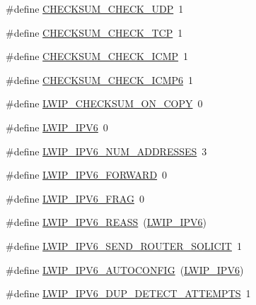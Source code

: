 \begin{DoxyCompactItemize}
\item 
\#define \hyperlink{group__lwip__opts__checksum_ga6747f7b72abe544fd4dc184cc7fcad37}{C\+H\+E\+C\+K\+S\+U\+M\+\_\+\+C\+H\+E\+C\+K\+\_\+\+U\+DP}~1
\item 
\#define \hyperlink{group__lwip__opts__checksum_gab676cc29571b7ffda12336482ad97699}{C\+H\+E\+C\+K\+S\+U\+M\+\_\+\+C\+H\+E\+C\+K\+\_\+\+T\+CP}~1
\item 
\#define \hyperlink{group__lwip__opts__checksum_ga79807171be8c20b69a5cd8de83566d25}{C\+H\+E\+C\+K\+S\+U\+M\+\_\+\+C\+H\+E\+C\+K\+\_\+\+I\+C\+MP}~1
\item 
\#define \hyperlink{group__lwip__opts__checksum_gaf466a10b093489910a773fd1cec74c2d}{C\+H\+E\+C\+K\+S\+U\+M\+\_\+\+C\+H\+E\+C\+K\+\_\+\+I\+C\+M\+P6}~1
\item 
\#define \hyperlink{group__lwip__opts__checksum_ga9f60183f0442bdbeefd6b395c6647613}{L\+W\+I\+P\+\_\+\+C\+H\+E\+C\+K\+S\+U\+M\+\_\+\+O\+N\+\_\+\+C\+O\+PY}~0
\item 
\#define \hyperlink{group__lwip__opts__ipv6_ga872e3bb3fe2212156d66b18fccc9643f}{L\+W\+I\+P\+\_\+\+I\+P\+V6}~0
\item 
\#define \hyperlink{group__lwip__opts__ipv6_ga16c1b672604bfb0a66a6aeeb854589d3}{L\+W\+I\+P\+\_\+\+I\+P\+V6\+\_\+\+N\+U\+M\+\_\+\+A\+D\+D\+R\+E\+S\+S\+ES}~3
\item 
\#define \hyperlink{group__lwip__opts__ipv6_gac96c5802de6c75dd62ab38cff6d16a32}{L\+W\+I\+P\+\_\+\+I\+P\+V6\+\_\+\+F\+O\+R\+W\+A\+RD}~0
\item 
\#define \hyperlink{group__lwip__opts__ipv6_ga9ab6269f3087f6d9f7b2c7181ef043c3}{L\+W\+I\+P\+\_\+\+I\+P\+V6\+\_\+\+F\+R\+AG}~0
\item 
\#define \hyperlink{group__lwip__opts__ipv6_gad0ef160d72e63b02c5e875b06ec53864}{L\+W\+I\+P\+\_\+\+I\+P\+V6\+\_\+\+R\+E\+A\+SS}~(\hyperlink{openmote-cc2538_2lwip_2test_2fuzz_2lwipopts_8h_a872e3bb3fe2212156d66b18fccc9643f}{L\+W\+I\+P\+\_\+\+I\+P\+V6})
\item 
\#define \hyperlink{group__lwip__opts__ipv6_ga273ed2e1a4e6a43713a0e4a06a34ee5c}{L\+W\+I\+P\+\_\+\+I\+P\+V6\+\_\+\+S\+E\+N\+D\+\_\+\+R\+O\+U\+T\+E\+R\+\_\+\+S\+O\+L\+I\+C\+IT}~1
\item 
\#define \hyperlink{group__lwip__opts__ipv6_ga580039bf2baf49fcb9e504e5d2b40a03}{L\+W\+I\+P\+\_\+\+I\+P\+V6\+\_\+\+A\+U\+T\+O\+C\+O\+N\+F\+IG}~(\hyperlink{openmote-cc2538_2lwip_2test_2fuzz_2lwipopts_8h_a872e3bb3fe2212156d66b18fccc9643f}{L\+W\+I\+P\+\_\+\+I\+P\+V6})
\item 
\#define \hyperlink{group__lwip__opts__ipv6_gad8489522d34f37e42b4001bab3781bcb}{L\+W\+I\+P\+\_\+\+I\+P\+V6\+\_\+\+D\+U\+P\+\_\+\+D\+E\+T\+E\+C\+T\+\_\+\+A\+T\+T\+E\+M\+P\+TS}~1

\end{DoxyCompactItemize}
